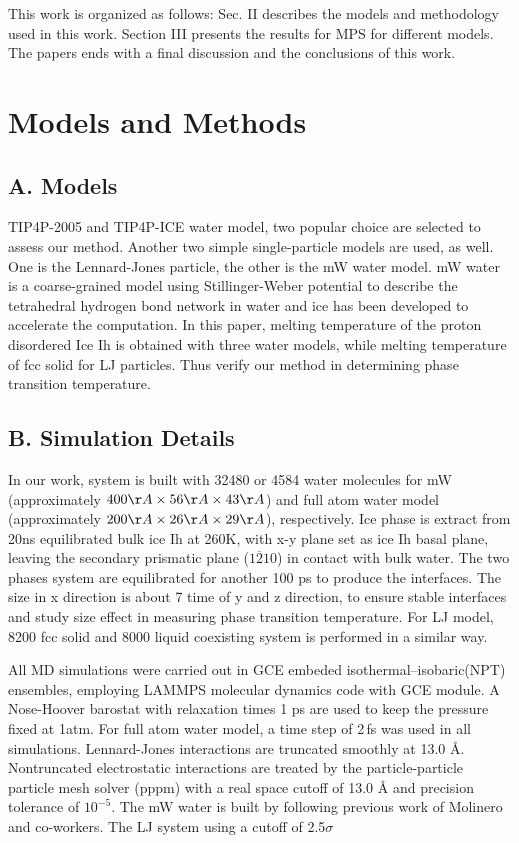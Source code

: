 \documentclass[aps,prl,twocolumn,superscriptaddress]{revtex4-1}
\begin{document}
This work is organized as follows: Sec. II describes the models and methodology used in this work. Section III presents the results for MPS for different models. The papers ends with a final discussion and the conclusions of this work.
\section{Models and Methods} 
\subsection{A. Models}
TIP4P-2005 and TIP4P-ICE water model, two popular choice are selected to assess our method. Another two simple single-particle models are used, as well. One is the Lennard-Jones particle, the other is the mW water model. mW water is a coarse-grained model\cite{Molinero2009} using Stillinger-Weber potential to describe the tetrahedral hydrogen bond network in water and ice has been developed to accelerate the computation. In this paper, melting temperature of the proton disordered Ice Ih is obtained with three water models, while melting temperature of fcc solid for LJ particles. Thus verify our method in determining phase transition temperature. 

\subsection{B. Simulation Details}
In our work, system is built with 32480 or 4584 water molecules for mW (approximately $400 \AA \times 56 \AA \times 43 \AA$) and full atom water model (approximately $200 \AA \times 26 \AA \times 29 \AA$), respectively. Ice phase is extract from 20ns equilibrated bulk ice Ih at 260K, with x-y plane set as ice Ih basal plane, leaving the secondary prismatic plane ($1\overline{2}10$) in contact with bulk water. The two phases system are equilibrated for another 100 ps to produce the interfaces. The size in x direction is about 7 time of y and z direction, to ensure stable interfaces and study size effect in measuring phase transition temperature. For LJ model, 8200 fcc solid and 8000 liquid coexisting system is performed in a similar way.

All MD simulations were carried out in GCE embeded isothermal–isobaric(NPT) ensembles, employing LAMMPS molecular dynamics code with GCE module\cite{Xu2012}. A Nose-Hoover barostat\cite{Hoover1985} with  relaxation times 1 ps are used to keep the pressure fixed at 1atm. For full atom water model, a time step of 2\,fs  was used in all simulations. Lennard-Jones interactions are truncated smoothly at 13.0 Å. Nontruncated electrostatic interactions are treated by the particle-particle particle mesh solver (pppm) with a real space cutoff of 13.0 Å and precision tolerance of $10^{-5}$.  The mW water is built by following previous work of Molinero and co-workers\cite{Molinero2009}. The LJ system using a cutoff of 2.5$\sigma$
\end{document}
